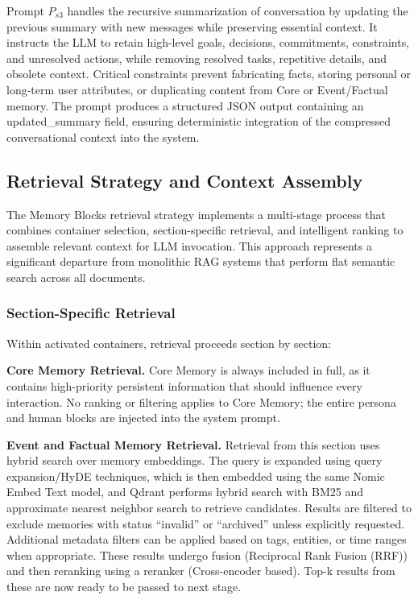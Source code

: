 ﻿\documentclass[12pt,a4paper]{article}
\begin{document}
Prompt $P_{s3}$ handles the recursive summarization of conversation by updating the previous summary with new messages while preserving essential context. It instructs the LLM to retain high-level goals, decisions, commitments, constraints, and unresolved actions, while removing resolved tasks, repetitive details, and obsolete context. Critical constraints prevent fabricating facts, storing personal or long-term user attributes, or duplicating content from Core or Event/Factual memory. The prompt produces a structured JSON output containing an updated\_summary field, ensuring deterministic integration of the compressed conversational context into the system.

\subsection{Retrieval Strategy and Context Assembly}

The Memory Blocks retrieval strategy implements a multi-stage process that combines container selection, section-specific retrieval, and intelligent ranking to assemble relevant context for LLM invocation. This approach represents a significant departure from monolithic RAG systems that perform flat semantic search across all documents.

\subsubsection{Section-Specific Retrieval}

Within activated containers, retrieval proceeds section by section:

\textbf{Core Memory Retrieval.} Core Memory is always included in full, as it contains high-priority persistent information that should influence every interaction. No ranking or filtering applies to Core Memory; the entire persona and human blocks are injected into the system prompt.

\textbf{Event and Factual Memory Retrieval.} Retrieval from this section uses hybrid search over memory embeddings. The query is expanded using query expansion/HyDE techniques, which is then embedded using the same Nomic Embed Text model, and Qdrant performs hybrid search with BM25 and approximate nearest neighbor search to retrieve candidates. Results are filtered to exclude memories with status ``invalid'' or ``archived'' unless explicitly requested. Additional metadata filters can be applied based on tags, entities, or time ranges when appropriate. These results undergo fusion (Reciprocal Rank Fusion (RRF)) and then reranking using a reranker (Cross-encoder based). Top-k results from these are now ready to be passed to next stage.
\end{document}
